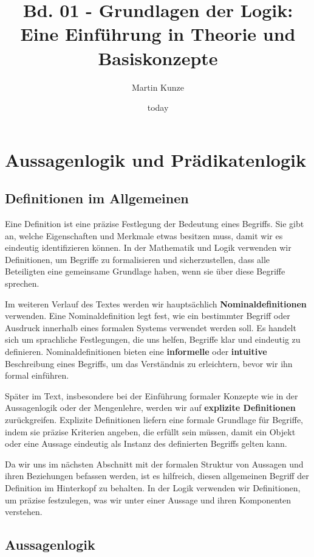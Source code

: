 \documentclass[main.tex]{subfiles}
\title{Bd. 01 - Grundlagen der Logik: Eine Einführung in Theorie und Basiskonzepte}
\author{Martin Kunze}
\date{today}
\begin{document}
\maketitle
\tableofcontents
\chapter{Aussagenlogik und Prädikatenlogik}

\section{Definitionen im Allgemeinen}

Eine Definition ist eine präzise Festlegung der Bedeutung eines Begriffs. Sie gibt an, welche Eigenschaften und Merkmale etwas besitzen muss, damit wir es eindeutig identifizieren können. In der Mathematik und Logik verwenden wir Definitionen, um Begriffe zu formalisieren und sicherzustellen, dass alle Beteiligten eine gemeinsame Grundlage haben, wenn sie über diese Begriffe sprechen.

Im weiteren Verlauf des Textes werden wir hauptsächlich \textbf{Nominaldefinitionen} verwenden. Eine Nominaldefinition legt fest, wie ein bestimmter Begriff oder Ausdruck innerhalb eines formalen Systems verwendet werden soll. Es handelt sich um sprachliche Festlegungen, die uns helfen, Begriffe klar und eindeutig zu definieren. Nominaldefinitionen bieten eine \textbf{informelle} oder \textbf{intuitive} Beschreibung eines Begriffs, um das Verständnis zu erleichtern, bevor wir ihn formal einführen.

Später im Text, insbesondere bei der Einführung formaler Konzepte wie in der Aussagenlogik oder der Mengenlehre, werden wir auf \textbf{explizite Definitionen} zurückgreifen. Explizite Definitionen liefern eine formale Grundlage für Begriffe, indem sie präzise Kriterien angeben, die erfüllt sein müssen, damit ein Objekt oder eine Aussage eindeutig als Instanz des definierten Begriffs gelten kann.

Da wir uns im nächsten Abschnitt mit der formalen Struktur von Aussagen und ihren Beziehungen befassen werden, ist es hilfreich, diesen allgemeinen Begriff der Definition im Hinterkopf zu behalten. In der Logik verwenden wir Definitionen, um präzise festzulegen, was wir unter einer Aussage und ihren Komponenten verstehen.

\section{Aussagenlogik}
\end{document}
